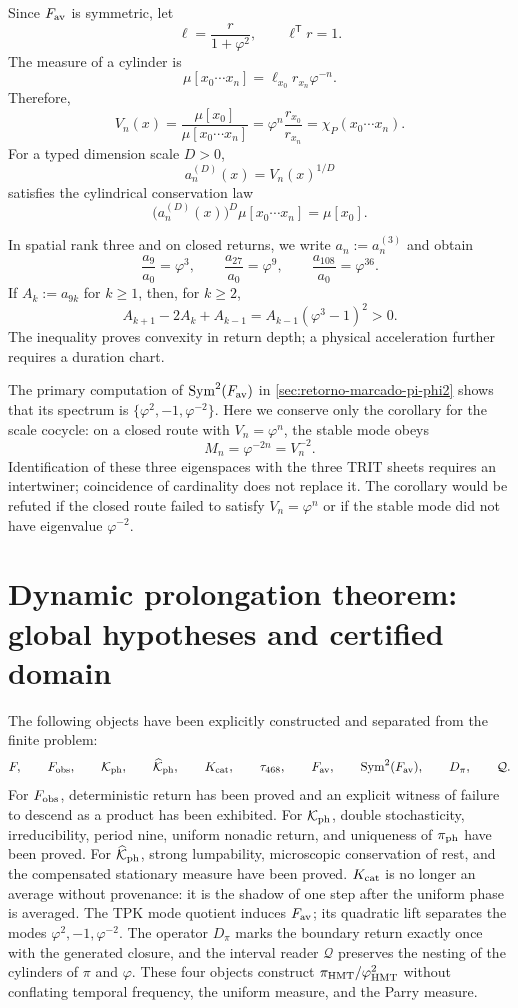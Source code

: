 Since \(F_{\rm av}\) is symmetric, let
\[
\ell=\frac{r}{1+\varphi^2},\qquad \ell^{\mathsf T}r=1.
\]
The measure of a cylinder is
\[
\mu[x_0\cdots x_n]=\ell_{x_0}r_{x_n}\varphi^{-n}.
\]
Therefore,
\[
\boxed{
V_n(x)
=\frac{\mu[x_0]}{\mu[x_0\cdots x_n]}
=\varphi^n\frac{r_{x_0}}{r_{x_n}}
=\chi_P(x_0\cdots x_n).}
\]
For a typed dimension scale \(D>0\),
\[
a_n^{(D)}(x)=V_n(x)^{1/D}
\]
satisfies the cylindrical conservation law
\[
\boxed{
\bigl(a_n^{(D)}(x)\bigr)^D
\mu[x_0\cdots x_n]=\mu[x_0].}
\]

In spatial rank three and on closed returns, we write
\(a_n:=a_n^{(3)}\) and obtain
\[
\boxed{
\frac{a_9}{a_0}=\varphi^3,\qquad
\frac{a_{27}}{a_0}=\varphi^9,\qquad
\frac{a_{108}}{a_0}=\varphi^{36}.}
\]
If \(A_k:=a_{9k}\) for \(k\geq1\), then, for \(k\geq2\),
\[
A_{k+1}-2A_k+A_{k-1}
=A_{k-1}(\varphi^3-1)^2>0.
\]
The inequality proves convexity in return depth; a physical
acceleration further requires a duration chart.

The primary computation of
\(\operatorname{Sym}^2(F_{\rm av})\) in
\cref{sec:retorno-marcado-pi-phi2} shows that its spectrum is
\(\{\varphi^2,-1,\varphi^{-2}\}\). Here we conserve only the corollary
for the scale cocycle: on a closed route with \(V_n=\varphi^n\), the
stable mode obeys
\[
\boxed{M_n=\varphi^{-2n}=V_n^{-2}.}
\]
Identification of these three eigenspaces with the three TRIT sheets
requires an intertwiner; coincidence of cardinality does not replace it. The
corollary would be refuted if the closed route failed to satisfy
\(V_n=\varphi^n\) or if the stable mode did not have eigenvalue
\(\varphi^{-2}\).

\section{Dynamic prolongation theorem: global hypotheses and certified domain}

The following objects have been explicitly constructed and separated from the finite problem:
\[
 F,
 \qquad
 F_{\rm obs},
 \qquad
 \mathcal K_{\rm ph},
 \qquad
 \widehat{\mathcal K}_{\rm ph},
 \qquad
 K_{\rm cat},
 \qquad
 \tau_{468},
 \qquad
 F_{\rm av},
 \qquad
 \operatorname{Sym}^2(F_{\rm av}),
 \qquad
 D_\pi,
 \qquad
 \mathcal Q.
\]
For \(F_{\rm obs}\), deterministic return has been proved and an
explicit witness of failure to descend as a product has been exhibited. For \(\mathcal K_{\rm ph}\),
double stochasticity, irreducibility, period nine, uniform
nonadic return, and uniqueness of
\(\pi_{\rm ph}\) have been proved. For \(\widehat{\mathcal K}_{\rm ph}\), strong
lumpability, microscopic conservation of rest, and the compensated
stationary measure have been proved. \(K_{\rm cat}\) is no longer an average without
provenance: it is the shadow of one step after the uniform phase is averaged.
The TPK mode quotient induces \(F_{\rm av}\); its quadratic lift
separates the modes \(\varphi^2,-1,\varphi^{-2}\). The operator \(D_\pi\)
marks the boundary return exactly once with the generated closure, and the
interval reader \(\mathcal Q\) preserves the nesting of the cylinders of
\(\pi\) and \(\varphi\). These four objects construct
\(\pi_{\rm HMT}/\varphi_{\rm HMT}^2\) without conflating temporal frequency,
the uniform measure, and the Parry measure.

